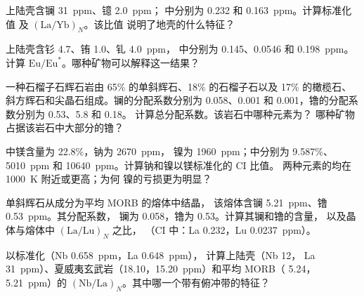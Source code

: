 \begin{exercise}[$\star$]\label{exo:b2:elements-in-the-earth:3}
上陆壳含镧 \qty{31}{ppm}、镱 \qty{2.0}{ppm}；
中分别为 0.232 和 \qty{0.163}{ppm}。计算标准化值
及 $(\mathrm{La}/\mathrm{Yb})_N$。该比值
说明了地壳的什么特征？
\end{exercise}

\begin{exercise}[$\star$]\label{exo:b2:elements-in-the-earth:4}
上陆壳含钐 4.7、铕 1.0、钆 \qty{4.0}{ppm}，
中分别为 0.145、0.0546 和 \qty{0.198}{ppm}。
计算 $\mathrm{Eu}/\mathrm{Eu}^*$。哪种矿物可以解释这一结果？
\end{exercise}

\begin{exercise}[$\star\star$]\label{exo:b2:elements-in-the-earth:5}
一种石榴子石辉石岩由 65\% 的单斜辉石、18\% 的石榴子石以及
17\% 的橄榄石、斜方辉石和尖晶石组成。镧的分配系数分别为
0.058、0.001 和 0.001，镥的分配系数分别为 0.53、5.8 和 0.18。
计算总分配系数。该岩石中哪种元素为？
哪种矿物占据该岩石中大部分的镥？
\end{exercise}

\begin{exercise}[$\star\star$]\label{exo:b2:elements-in-the-earth:6}
中镁含量为 22.8\%，钠为 \qty{2670}{ppm}，
镍为 \qty{1960}{ppm}；中分别为 9.587\%、
\qty{5010}{ppm} 和 \qty{10640}{ppm}。计算钠和镍以镁标准化的 CI 比值。
两种元素的均在 \qty{1000}{K} 附近或更高；为何
镍的亏损更为明显？
\end{exercise}

\begin{exercise}[$\star\star$]\label{exo:b2:elements-in-the-earth:7}
单斜辉石从成分为平均 MORB 的熔体中结晶，
该熔体含镧 \qty{5.21}{ppm}、镥 \qty{0.53}{ppm}。其分配系数，
镧为 0.058，镥为 0.53。计算其镧和镥的含量，
以及晶体与熔体中 $(\mathrm{La}/\mathrm{Lu})_N$ 之比，
（CI 中：La 0.232，Lu \qty{0.0237}{ppm}）。
\end{exercise}

\begin{exercise}[$\star\star$]\label{exo:b2:elements-in-the-earth:8}
以标准化（Nb \qty{0.658}{ppm}，La \qty{0.648}{ppm}），
计算上陆壳（Nb 12，
La \qty{31}{ppm}）、夏威夷玄武岩（18.10，\qty{15.20}{ppm}）和平均 MORB（
5.24，\qty{5.21}{ppm}）的 $(\mathrm{Nb}/\mathrm{La})_N$。其中哪一个带有俯冲带的特征？
\end{exercise}

